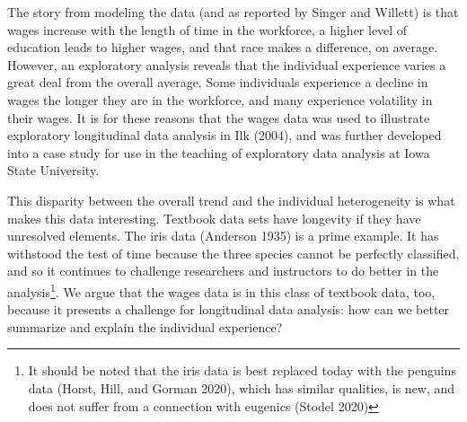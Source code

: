 \documentclass{article}
\begin{document}
The story from modeling the data (and as reported by Singer and Willett) is that wages increase with the length of time in the workforce, a higher level of education leads to higher wages, and that race makes a difference, on average. However, an exploratory analysis reveals that the individual experience varies a great deal from the overall average. Some individuals experience a decline in wages the longer they are in the workforce, and many experience volatility in their wages. It is for these reasons that the wages data was used to illustrate exploratory longitudinal data analysis in Ilk (2004), and was further developed into a case study for use in the teaching of exploratory data analysis at Iowa State University.

This disparity between the overall trend and the individual heterogeneity is what makes this data interesting. Textbook data sets have longevity if they have unresolved elements. The iris data (Anderson 1935) is a prime example. It has withstood the test of time because the three species cannot be perfectly classified, and so it continues to challenge researchers and instructors to do better in the analysis\footnote{It should be noted that the iris data is best replaced today with the penguins data (Horst, Hill, and Gorman 2020), which has similar qualities, is new, and does not suffer from a connection with eugenics (Stodel 2020)}. We argue that the wages data is in this class of textbook data, too, because it presents a challenge for longitudinal data analysis: how can we better summarize and explain the individual experience?
\end{document}
